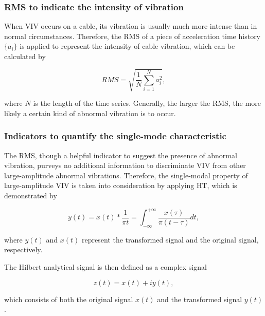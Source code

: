 \documentclass[preprint, 3p, times, compress, 11pt]{elsarticle}
\begin{document}
\subsubsection{RMS to indicate the intensity of vibration}

When VIV occurs on a cable, its vibration is usually much more intense 
than in normal circumstances. Therefore, the RMS of a piece of 
acceleration time history $\{a_i\}$ is applied to represent the intensity 
of cable vibration, which can be calculated by 

\begin{equation}
    RMS = \sqrt{\frac{1}{N} \sum_{i=1}^{N} a_{i}^{2}},
    \label{eq:RMS}
\end{equation}

where $N$ is the length of the time series. Generally, the larger the RMS, 
the more likely a certain kind of abnormal vibration is to occur.

\subsubsection{Indicators to quantify the single-mode characteristic}



The RMS, though a helpful indicator to suggest the presence of abnormal 
vibration, purveys no additional information to discriminate VIV from other 
large-amplitude abnormal vibrations. Therefore, the single-modal property 
of large-amplitude VIV is taken into consideration by applying HT, 
which is demonstrated by 

\begin{equation}
    y(t) = x(t) * \frac{1}{\pi t} = \int_{-\infty}^{+\infty} 
            \frac{x(\tau)}{\pi(t-\tau)} dt, 
    \label{eq:hilb}
\end{equation}

where $y(t)$ and $x(t)$ represent the transformed signal and the 
original signal, respectively. 

The Hilbert analytical signal is then defined as a complex signal 

\begin{equation}
    z(t) = x(t) + iy(t),
    \label{eq:comp_sign}
\end{equation}

which consists of both the original 
signal $x(t)$ and the transformed signal $y(t)$. 
\end{document}
